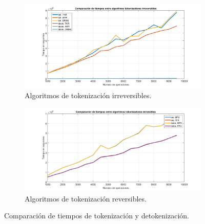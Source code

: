 \begin{figure}
  \centering
  \begin{subfigure}{1\textwidth}
    \begin{center}
      \includegraphics[width=1\linewidth]{diagramas/todo_irrev}
      \caption{Algoritmos de tokenización irreversibles.}
    \end{center}
  \end{subfigure}
  \begin{subfigure}{0.9\textwidth}
    \begin{center}
      \includegraphics[width=1\linewidth]{diagramas/todo_rev}
      \caption{Algoritmos de tokenización reversibles.}
    \end{center}
  \end{subfigure}
  \caption{Comparación de tiempos de tokenización y detokenización.}
  \label{figura:tok_comp}
\end{figure}
